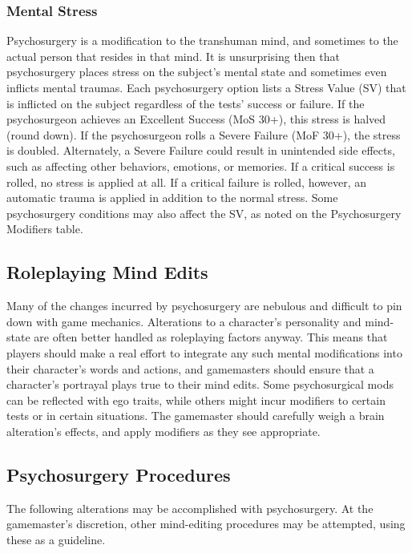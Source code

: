 \subsubsection{Mental Stress} Psychosurgery is a modification to the transhuman mind, and sometimes to the actual person that resides in that mind. It is unsurprising then that psychosurgery places stress on the subject’s mental state and sometimes even inflicts mental traumas. Each psychosurgery option lists a Stress Value (SV) that is inflicted on the subject regardless of the tests’ success or failure. If the psychosurgeon achieves an Excellent Success (MoS 30+), this stress is halved (round down). If the psychosurgeon rolls a Severe Failure (MoF 30+), the stress is doubled. Alternately, a Severe Failure could result in unintended side effects, such as affecting other behaviors, emotions, or memories. If a critical success is rolled, no stress is applied at all. If a critical failure is rolled, however, an automatic trauma is applied in addition to the normal stress. Some psychosurgery conditions may also affect the SV, as noted on the Psychosurgery Modifiers table. 



\subsection{Roleplaying Mind Edits} Many of the changes incurred by psychosurgery are nebulous and difficult to pin down with game mechanics. Alterations to a character’s personality and mind-state are often better handled as roleplaying factors anyway. This means that players should make a real effort to integrate any such mental modifications into their character’s words and actions, and gamemasters should ensure that a character’s portrayal plays true to their mind edits. Some psychosurgical mods can be reflected with ego traits, while others might incur modifiers to certain tests or in certain situations. The gamemaster should carefully weigh a brain alteration’s effects, and apply modifiers as they see appropriate. 



\subsection{Psychosurgery Procedures} The following alterations may be accomplished with psychosurgery. At the gamemaster’s discretion, other mind-editing procedures may be attempted, using these as a guideline. 



